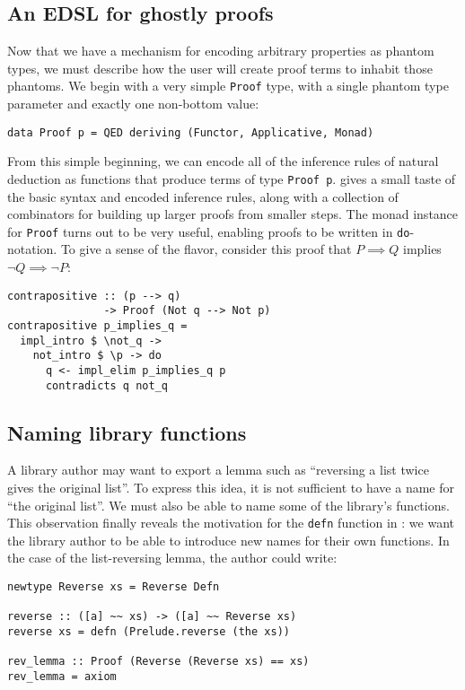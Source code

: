 \documentclass[format=sigplan, review=false, screen=true]{acmart}
\begin{document}
\subsection{An EDSL for ghostly proofs}
Now that we have a mechanism for encoding arbitrary properties as phantom types, we must describe how the
user will create proof terms to inhabit those phantoms. We begin with a very simple \texttt{Proof} type,
with a single phantom type parameter and exactly one non-bottom value:
\begin{verbatim}
data Proof p = QED deriving (Functor, Applicative, Monad)
\end{verbatim} 
From this simple beginning, we can encode all of the inference rules of natural deduction as functions that
produce terms of type \texttt{Proof p}.
 gives a small taste of the basic syntax and encoded inference rules, along with
a collection of combinators for building up larger proofs from smaller steps.
The monad instance for \texttt{Proof} turns out to be very useful, enabling proofs to be written in
\texttt{do}-notation. To give a sense of the flavor, consider this proof that $P \implies Q$ implies $\neg Q \implies \neg P$:
\begin{verbatim}
contrapositive :: (p --> q)
               -> Proof (Not q --> Not p)
contrapositive p_implies_q =
  impl_intro $ \not_q ->
    not_intro $ \p -> do
      q <- impl_elim p_implies_q p
      contradicts q not_q
\end{verbatim}

\subsection{Naming library functions}
A library author may want to export a lemma such as ``reversing a list twice gives the original list''.
To express this idea, it is not sufficient to have a name for ``the original list''. We must also be able to
name some of the library's functions. This observation finally reveals the motivation for  the \texttt{defn}
function in : we want the library author to be able to introduce new names for their own functions.
In the case of the list-reversing lemma, the author could write:
\begin{verbatim}
newtype Reverse xs = Reverse Defn

reverse :: ([a] ~~ xs) -> ([a] ~~ Reverse xs)
reverse xs = defn (Prelude.reverse (the xs))

rev_lemma :: Proof (Reverse (Reverse xs) == xs)
rev_lemma = axiom
\end{verbatim}
\end{document}
